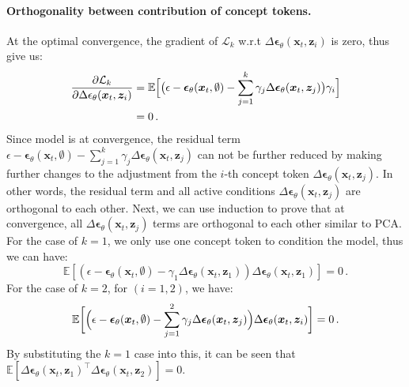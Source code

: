 \documentclass[10pt,twocolumn,letterpaper]{article}
\begin{document}
\paragraph{Orthogonality between contribution of concept tokens.}
At the optimal convergence, the gradient of $\mathcal{L}_k$ w.r.t $\Delta \bm{\epsilon}_{\theta}(\bm{x}_t, \bm{z}_i)$ is zero, thus give us:
\begin{equation}
\begin{split}
\frac{\partial \mathcal{L}_k}{\partial \Delta \epsilon_\theta(\bm{x}_t, \bm{z}_i)} &= \mathbb{E} \Bigl[ \bigl( \epsilon - \bm{\epsilon}_\theta(\bm{x}_t, \emptyset) - \sum_{j=1}^k \gamma_j \Delta\bm{\epsilon}_{\theta}(\bm{x}_t, \bm{z}_j) \bigr) \gamma_i\Bigr]\\&=0 \,. \nonumber
\end{split}
\end{equation}
Since model is at convergence, the residual term $\epsilon - \bm{\epsilon}_\theta(\bm{x}_t, \emptyset) - \sum_{j=1}^k \gamma_j \Delta\bm{\epsilon}_{\theta}(\bm{x}_t, \bm{z}_j)$ can not be further reduced by making further changes to the adjustment from the $i$-th concept token $\Delta\bm{\epsilon}_\theta(\bm{x}_t, \bm{z}_j)$. 
In other words, the residual term and all active conditions $\Delta\bm{\epsilon}_\theta(\bm{x}_t, \bm{z}_j)$ are orthogonal to each other.
Next, we can use induction to prove that at convergence, all $\Delta\bm{\epsilon}_\theta(\bm{x}_t, \bm{z}_j)$ terms are orthogonal to each other similar to PCA.
For the case of $k=1$, we only use one concept token to condition the model, thus we can have:
\begin{equation}
\mathbb{E}\left[ \left( \epsilon -  \bm{\epsilon}_\theta(\bm{x}_t, \emptyset) - \gamma_1 \Delta\bm{\epsilon}_\theta(\bm{x}_t, \bm{z}_1) \right) \Delta\bm{\epsilon}_\theta(\bm{x}_t, \bm{z}_1) \right] = 0 \,. \nonumber
\end{equation}
For the case of $k=2$, for $(i=1,2)$, we have:
\begin{equation}
\begin{split}
\mathbb{E}\biggl[ \Bigl(\epsilon - \bm{\epsilon}_\theta(\bm{x}_t, \emptyset)
 - \sum_{j=1}^2\gamma_j \Delta\bm{\epsilon}_\theta(\bm{x}_t, \bm{z}_j) \Bigr) \Delta\bm{\epsilon}_\theta(\bm{x}_t, \bm{z}_i) \biggr] = 0 \,.  \nonumber
\end{split}
\end{equation}
By substituting the $k=1$ case into this, it can be seen that $\mathbb{E}\left[ \Delta\bm{\epsilon}_\theta(\bm{x}_t, \bm{z}_1)^\top  \Delta\bm{\epsilon}_\theta(\bm{x}_t, \bm{z}_2) \right]=0$.
\end{document}

